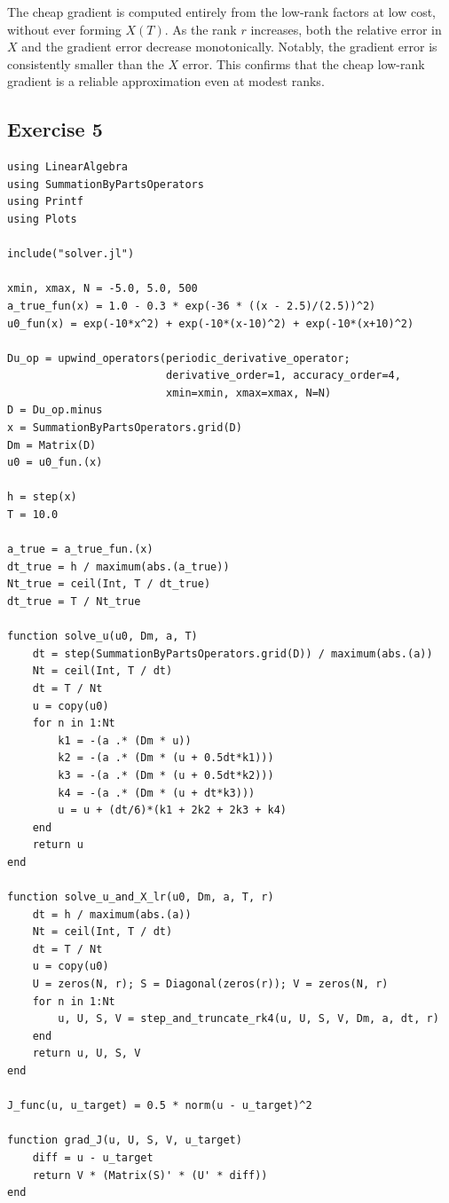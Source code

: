 \documentclass[11pt]{article}
\begin{document}
The cheap gradient is computed entirely from the low-rank factors at low cost, without ever forming $X(T)$. As the rank $r$ increases, both the relative error in $X$ and the gradient error decrease monotonically. Notably, the gradient error is consistently smaller than the $X$ error. This confirms that the cheap low-rank gradient is a reliable approximation even at modest ranks.

\subsection*{Exercise 5}

\begin{lstlisting}
using LinearAlgebra
using SummationByPartsOperators
using Printf
using Plots

include("solver.jl")  

xmin, xmax, N = -5.0, 5.0, 500
a_true_fun(x) = 1.0 - 0.3 * exp(-36 * ((x - 2.5)/(2.5))^2)
u0_fun(x) = exp(-10*x^2) + exp(-10*(x-10)^2) + exp(-10*(x+10)^2)

Du_op = upwind_operators(periodic_derivative_operator;
                         derivative_order=1, accuracy_order=4,
                         xmin=xmin, xmax=xmax, N=N)
D = Du_op.minus
x = SummationByPartsOperators.grid(D)
Dm = Matrix(D)
u0 = u0_fun.(x)

h = step(x)
T = 10.0

a_true = a_true_fun.(x)
dt_true = h / maximum(abs.(a_true))
Nt_true = ceil(Int, T / dt_true)
dt_true = T / Nt_true

function solve_u(u0, Dm, a, T)
    dt = step(SummationByPartsOperators.grid(D)) / maximum(abs.(a))
    Nt = ceil(Int, T / dt)
    dt = T / Nt
    u = copy(u0)
    for n in 1:Nt
        k1 = -(a .* (Dm * u))
        k2 = -(a .* (Dm * (u + 0.5dt*k1)))
        k3 = -(a .* (Dm * (u + 0.5dt*k2)))
        k4 = -(a .* (Dm * (u + dt*k3)))
        u = u + (dt/6)*(k1 + 2k2 + 2k3 + k4)
    end
    return u
end

function solve_u_and_X_lr(u0, Dm, a, T, r)
    dt = h / maximum(abs.(a))
    Nt = ceil(Int, T / dt)
    dt = T / Nt
    u = copy(u0)
    U = zeros(N, r); S = Diagonal(zeros(r)); V = zeros(N, r)
    for n in 1:Nt
        u, U, S, V = step_and_truncate_rk4(u, U, S, V, Dm, a, dt, r)
    end
    return u, U, S, V
end

J_func(u, u_target) = 0.5 * norm(u - u_target)^2

function grad_J(u, U, S, V, u_target)
    diff = u - u_target
    return V * (Matrix(S)' * (U' * diff))
end


\end{lstlisting}
\end{document}
